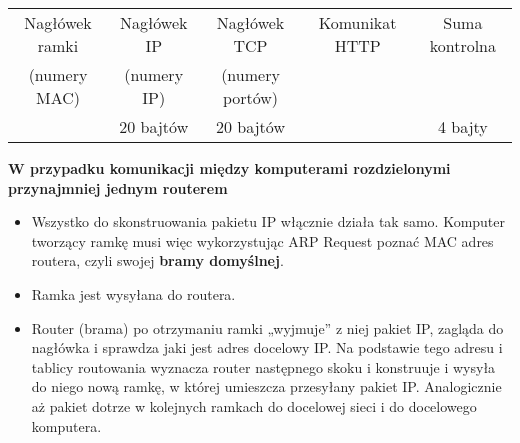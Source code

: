 \documentclass[../main.tex]{subfiles}
\begin{document}
    \begin{tabular}{|c|c|c|c|c|}
        \hline
        Nagłówek ramki & Nagłówek IP & Nagłówek TCP & Komunikat HTTP & Suma kontrolna\\
        (numery MAC) & (numery IP) & (numery portów) & & \\
        & 20 bajtów & 20 bajtów & & 4 bajty\\
        \hline
    \end{tabular}

    \textbf{W przypadku komunikacji między komputerami rozdzielonymi przynajmniej jednym routerem}
    \begin{itemize}
        \item Wszystko do skonstruowania pakietu IP włącznie działa tak samo. Komputer tworzący ramkę musi więc wykorzystując ARP Request poznać
        MAC adres routera, czyli swojej \textbf{bramy domyślnej}.
        \item Ramka jest wysyłana do routera.
        \item Router (brama) po otrzymaniu ramki „wyjmuje” z niej pakiet IP, zagląda do nagłówka i sprawdza jaki jest adres docelowy IP. Na podstawie
        tego adresu i tablicy routowania wyznacza router następnego skoku i konstruuje i wysyła do niego nową ramkę, w której umieszcza przesyłany pakiet IP. Analogicznie aż pakiet dotrze w kolejnych ramkach do docelowej sieci i do docelowego komputera.
    \end{itemize}
\end{document}
